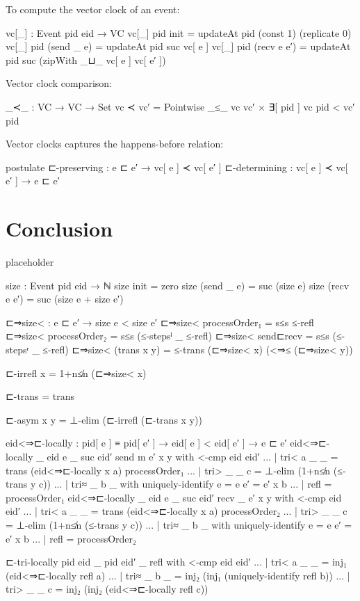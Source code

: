 \documentclass[acmsmall,review,anonymous]{acmart}
\theoremstyle{definition}
\theoremstyle{theorem}
\begin{document}
To compute the vector clock of an event:
\begin{code}
vc[_] : Event pid eid → VC
vc[_] {pid} init        = updateAt pid (const 1) (replicate 0)
vc[_] {pid} (send _ e)  = updateAt pid suc vc[ e ]
vc[_] {pid} (recv e e′) = updateAt pid suc (zipWith _⊔_ vc[ e ] vc[ e′ ])
\end{code}

Vector clock comparison:
\begin{code}
_≺_ : VC → VC → Set
vc ≺ vc′ = Pointwise _≤_ vc vc′ × ∃[ pid ] vc pid < vc′ pid
\end{code}

Vector clocks captures the happens-before relation:
\begin{code}
postulate
  ⊏-preserving : e ⊏ e′ →  vc[ e ] ≺ vc[ e′ ]
  ⊏-determining : vc[ e ] ≺ vc[ e′ ] → e ⊏ e′
\end{code}

\section{Conclusion}
placeholder~\citep{mattern-vector-time, fidge-vector-time, schmuck-dissertation}



\appendix

\begin{code}
size : Event pid eid → ℕ
size init        = zero
size (send _ e)  = suc (size e)
size (recv e e′) = suc (size e + size e′)

⊏⇒size< : e ⊏ e′ → size e < size e′
⊏⇒size< processOrder₁ = s≤s ≤-refl
⊏⇒size< processOrder₂ = s≤s (≤-stepsˡ _ ≤-refl)
⊏⇒size< send⊏recv     = s≤s (≤-stepsʳ _ ≤-refl)
⊏⇒size< (trans x y)   = ≤-trans (⊏⇒size< x) (<⇒≤ (⊏⇒size< y))

⊏-irrefl x = 1+n≰n (⊏⇒size< x)

⊏-trans = trans

⊏-asym x y = ⊥-elim (⊏-irrefl (⊏-trans x y))

eid<⇒⊏-locally : pid[ e ] ≡ pid[ e′ ] → eid[ e ] < eid[ e′ ] → e ⊏ e′
eid<⇒⊏-locally {_} {eid} {e} {_} {suc eid′} {send m e′} x y with <-cmp eid eid′
... | tri< a _ _ = trans (eid<⇒⊏-locally x a) processOrder₁
... | tri> _ _ c = ⊥-elim (1+n≰n (≤-trans y c))
... | tri≈ _ b _ with uniquely-identify {e = e} {e′ = e′} x b
... | refl = processOrder₁
eid<⇒⊏-locally {_} {eid} {e} {_} {suc eid′} {recv _ e′} x y with <-cmp eid eid′
... | tri< a _ _ = trans (eid<⇒⊏-locally x a) processOrder₂
... | tri> _ _ c = ⊥-elim (1+n≰n (≤-trans y c))
... | tri≈ _ b _ with uniquely-identify {e = e} {e′ = e′} x b
... | refl = processOrder₂

⊏-tri-locally {pid} {eid} {_} {pid} {eid′} {_} refl with <-cmp eid eid′
... | tri< a _ _ = inj₁ (eid<⇒⊏-locally refl a)
... | tri≈ _ b _ = inj₂ (inj₁ (uniquely-identify refl b))
... | tri> _ _ c = inj₂ (inj₂ (eid<⇒⊏-locally refl c))
\end{code}
\end{document}

